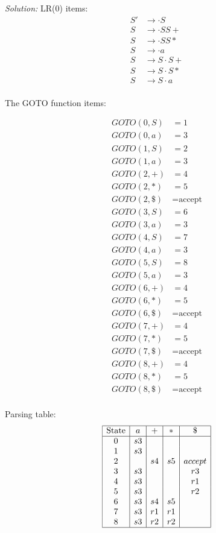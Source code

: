 \documentclass[a4paper, 11pt]{article}
\newenvironment{solution}
    {\textit{Solution:}}
    {}
\begin{document}
\begin{solution}
\noindent LR(0) items:
\begin{align*}
S' & \rightarrow \cdot S \\
S & \rightarrow \cdot SS+ \\
S & \rightarrow \cdot SS* \\
S & \rightarrow \cdot a \\
S & \rightarrow S \cdot S+ \\
S & \rightarrow S \cdot S* \\
S & \rightarrow S \cdot a \\
\end{align*}

\noindent The GOTO function items:

\begin{align*}
GOTO(0, S) &= 1 \\
GOTO(0, a) &= 3 \\
GOTO(1, S) &= 2 \\
GOTO(1, a) &= 3 \\
GOTO(2, +) &= 4 \\
GOTO(2, *) &= 5 \\
GOTO(2, \$) &= \text{accept} \\
GOTO(3, S) &= 6 \\
GOTO(3, a) &= 3 \\
GOTO(4, S) &= 7 \\
GOTO(4, a) &= 3 \\
GOTO(5, S) &= 8 \\
GOTO(5, a) &= 3 \\
GOTO(6, +) &= 4 \\
GOTO(6, *) &= 5 \\
GOTO(6, \$) &= \text{accept} \\
GOTO(7, +) &= 4 \\
GOTO(7, *) &= 5 \\
GOTO(7, \$) &= \text{accept} \\
GOTO(8, +) &= 4 \\
GOTO(8, *) &= 5 \\
GOTO(8, \$) &= \text{accept} \\
\end{align*}


\noindent Parsing table:
\[\begin{array}{|c|c|c|c|c|}
\hline
\text{State} & a & + & * & \$ \\
\hline
0 & s3 & & & \\
1 & s3 & & & \\
2 &  & s4 & s5 & accept \\
3 & s3 & & & r3 \\
4 & s3 & & & r1 \\
5 & s3 & & & r2 \\
6 & s3 & s4 & s5 & \\
7 & s3 & r1 & r1 & \\
8 & s3 & r2 & r2 & \\
\hline
\end{array}
\]


\end{solution}
\end{document}
